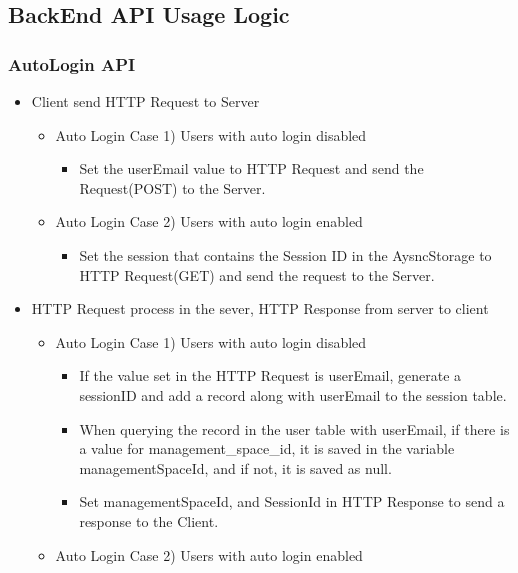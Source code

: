 \documentclass[conference]{IEEEtran}
\begin{document}
\newpage
\subsection{BackEnd API Usage Logic}
\subsubsection{AutoLogin API}
\begin{itemize}
    \item Client send HTTP Request to Server
    \begin{itemize}
        \item Auto Login Case 1) Users with auto login disabled
        \begin{itemize}
            \item Set the userEmail value to HTTP Request and send the Request(POST) to the Server.
        \end{itemize}
        \item Auto Login Case 2) Users with auto login enabled
        \begin{itemize}
            \item Set the session that contains the Session ID in the AysncStorage to HTTP Request(GET) and send the request to the Server.
            \\
        \end{itemize}
    \end{itemize}
    \item HTTP Request process in the sever, HTTP Response from server to client
    \begin{itemize}
        \item Auto Login Case 1) Users with auto login disabled
        \begin{itemize}
            \item If the value set in the HTTP Request is userEmail, generate a sessionID and add a record along with userEmail to the session table.
            \item When querying the record in the user table with userEmail, if there is a value for management\_space\_id, it is saved in the variable managementSpaceId, and if not, it is saved as null.
            \item Set managementSpaceId, and SessionId in HTTP Response to send a response to the Client.
        \end{itemize}
        \item Auto Login Case 2) Users with auto login enabled
        \begin{itemize}

\end{itemize}
\end{itemize}
\end{itemize}
\end{document}
